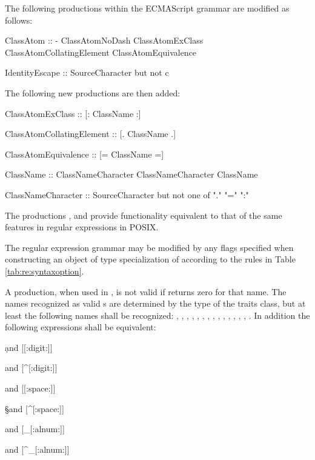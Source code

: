 \pnum
The following productions within the ECMAScript grammar are modified as follows:

\begin{codeblock}
ClassAtom ::
  -
  ClassAtomNoDash
  ClassAtomExClass
  ClassAtomCollatingElement
  ClassAtomEquivalence

IdentityEscape ::
  SourceCharacter but not c
\end{codeblock}

\pnum
The following new productions are then added:

\begin{codeblock}
ClassAtomExClass ::
  [: ClassName :]

ClassAtomCollatingElement ::
  [. ClassName .]

ClassAtomEquivalence ::
  [= ClassName =]

ClassName ::
  ClassNameCharacter
  ClassNameCharacter ClassName

ClassNameCharacter ::
  SourceCharacter but not one of "." "=" ":"
\end{codeblock}

\pnum
The productions , 
and  provide functionality
equivalent to that of the same features in regular expressions in POSIX.

\pnum
The regular expression grammar may be modified by
any  flags specified when
constructing an object of type specialization of 
according to the rules in Table \ref{tab:re:syntaxoption}.

\pnum
A  production, when used in ,
is not valid if  returns zero for
that name.  The names recognized as valid s are
determined by the type of the traits class, but at least the following
names shall be recognized:
, , , , ,
, , , , ,
, , , , .
In addition the following expressions shall be equivalent:

\begin{codeblock}
\d and [[:digit:]]

\D and [^[:digit:]]

\s and [[:space:]]

\S and [^[:space:]]

\w and [_[:alnum:]]

\W and [^_[:alnum:]]
\end{codeblock}

